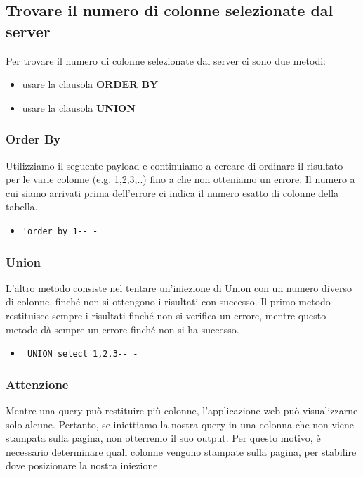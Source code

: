 \documentclass[oneside,a4paper,11pt]{book}
\theoremstyle{italicstyle}
\theoremstyle{normStyle}
\begin{document}
\subsection{Trovare il numero di colonne selezionate dal server}
Per trovare il numero di colonne selezionate dal server ci sono due metodi:
\begin{itemize}
    \item usare la clausola \textbf{ORDER BY}
    \item usare la clausola \textbf{UNION}
\end{itemize}

\subsubsection{Order By}
Utilizziamo il seguente payload e continuiamo a cercare di ordinare il risultato per le varie colonne (e.g. 1,2,3,..) fino a che non otteniamo un errore. Il numero a cui siamo arrivati prima dell'errore ci indica il numero esatto di colonne della tabella.
\begin{itemize}
    \item \begin{verbatim}'order by 1-- -\end{verbatim}
\end{itemize}

\subsubsection{Union}
L'altro metodo consiste nel tentare un'iniezione di Union con un numero diverso di colonne, finché non si ottengono i risultati con successo. Il primo metodo restituisce sempre i risultati finché non si verifica un errore, mentre questo metodo dà sempre un errore finché non si ha successo.
\begin{itemize}
    \item \begin{verbatim} UNION select 1,2,3-- -\end{verbatim}
\end{itemize}

\subsubsection{Attenzione}
Mentre una query può restituire più colonne, l'applicazione web può visualizzarne solo alcune. Pertanto, se iniettiamo la nostra query in una colonna che non viene stampata sulla pagina, non otterremo il suo output. Per questo motivo, è necessario determinare quali colonne vengono stampate sulla pagina, per stabilire dove posizionare la nostra iniezione.
\end{document}
